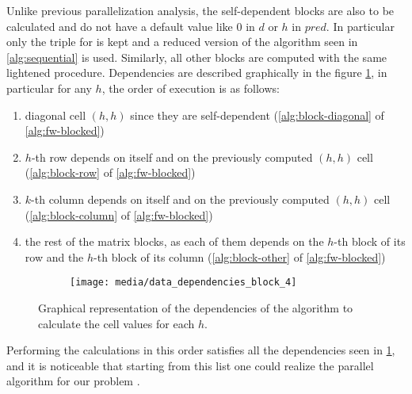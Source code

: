Unlike previous parallelization analysis, the self-dependent blocks are also to be calculated and do not have a default value like \(0\) in \(d\) or \(h\) in \(pred\). 
In particular only the triple for is kept and a reduced version of the algorithm seen in \cref{alg:sequential} is used.
Similarly, all other blocks are computed with the same lightened procedure. Dependencies are described graphically in the figure \cref{fig:data-dependency-external-loop-parallel}, in particular for any \(h\), the order of execution is as follows:

\begin{enumerate}
    \item diagonal cell \((h,h)\) since they are self-dependent (\cref{alg:block-diagonal} of \cref{alg:fw-blocked})
    \item \(h\)-th row depends on itself and on the previously computed  \((h,h)\) cell (\cref{alg:block-row}  of \cref{alg:fw-blocked})
    \item \(k\)-th column depends on itself and on the previously computed  \((h,h)\) cell (\cref{alg:block-column}  of \cref{alg:fw-blocked})
    \item the rest of the matrix blocks, as each of them depends on the \(h\)-th block of its row and the \(h\)-th block of its column (\cref{alg:block-other}  of \cref{alg:fw-blocked})
\end{enumerate}


\begin{figure}[htbp]
    \centering
    \begin{subfigure}[t]{0.8\textwidth}
        \centering
        \texttt{[image: media/data\_dependencies\_block\_4]}
    \end{subfigure}

    \caption{Graphical representation of the dependencies of the algorithm to calculate the cell values for each \(h\).}
    \label{fig:data-dependency-external-loop-parallel}
\end{figure}

Performing the calculations in this order satisfies all the dependencies seen in \cref{fig:data-dependency-external-loop-parallel}, and it is noticeable that starting from this list one could realize the parallel algorithm for our problem \cite{rucci}.

